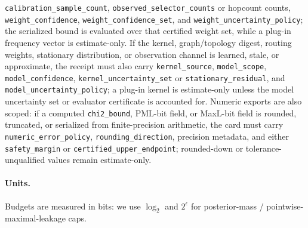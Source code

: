 \documentclass[11pt]{article}
\begin{document}
\nolinkurl{calibration_sample_count}, \nolinkurl{observed_selector_counts} or hopcount counts, \nolinkurl{weight_confidence}, \nolinkurl{weight_confidence_set}, and \nolinkurl{weight_uncertainty_policy}; the serialized bound is evaluated over that certified weight set, while a plug-in frequency vector is estimate-only. If the kernel, graph/topology digest, routing weights, stationary distribution, or observation channel is learned, stale, or approximate, the receipt must also carry \nolinkurl{kernel_source}, \nolinkurl{model_scope}, \nolinkurl{model_confidence}, \nolinkurl{kernel_uncertainty_set} or \nolinkurl{stationary_residual}, and \nolinkurl{model_uncertainty_policy}; a plug-in kernel is estimate-only unless the model uncertainty set or evaluator certificate is accounted for. Numeric exports are also scoped: if a computed \texttt{chi2\_bound}, PML-bit field, or MaxL-bit field is rounded, truncated, or serialized from finite-precision arithmetic, the card must carry \nolinkurl{numeric_error_policy}, \nolinkurl{rounding_direction}, precision metadata, and either \nolinkurl{safety_margin} or \nolinkurl{certified_upper_endpoint}; rounded-down or tolerance-unqualified values remain estimate-only.

\paragraph{Units.}
Budgets are measured in bits: we use $\log_2$ and $2^{\epsilon}$ for posterior-mass / pointwise-maximal-leakage caps.\cite{series:notation}
\end{document}
